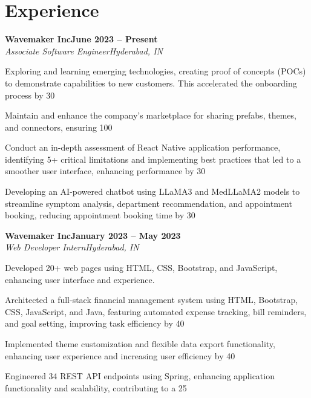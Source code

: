 \documentclass[letterpaper,10pt]{article}
\newcommand{\heading}[2]{
  \hspace{10pt}#1\hfill#2\\
}
\newcommand{\headingBf}[2]{
  \heading{\textbf{#1}}{\textbf{#2}}
}
\newcommand{\headingIt}[2]{
  \heading{\textit{#1}}{\textit{#2}}
}
\newenvironment{resume_list}{
  \vspace{-7pt}
  \begin{itemize}[itemsep=-2px, parsep=1pt, leftmargin=30pt]
}{
  \end{itemize}
}
\begin{document}
  \section{Experience}
  \headingBf{Wavemaker Inc}{June 2023 – Present}
  \headingIt{Associate Software Engineer}{Hyderabad, IN}
  \begin{resume_list}
    \item Exploring and learning emerging technologies, creating proof of concepts (POCs) to demonstrate capabilities to new customers. This accelerated the onboarding process by 30
    \item Maintain and enhance the company’s marketplace for sharing prefabs, themes, and connectors, ensuring 100
    \item Conduct an in-depth assessment of React Native application performance, identifying 5+ critical limitations and implementing best practices that led to a smoother user interface, enhancing performance by 30
    \item Developing an AI-powered chatbot using LLaMA3 and MedLLaMA2 models to streamline symptom analysis, department recommendation, and appointment booking, reducing appointment booking time by 30
  \end{resume_list}
  \headingBf{Wavemaker Inc}{January 2023 – May 2023}
  \headingIt{Web Developer Intern}{Hyderabad, IN}
  \begin{resume_list}
    \item Developed 20+ web pages using HTML, CSS, Bootstrap, and JavaScript, enhancing user interface and experience.
    \item Architected a full-stack financial management system using HTML, Bootstrap, CSS, JavaScript, and Java, featuring automated expense tracking, bill reminders, and goal setting, improving task efficiency by 40
    \item Implemented theme customization and flexible data export functionality, enhancing user experience and increasing user efficiency by 40
    \item Engineered 34 REST API endpoints using Spring, enhancing application functionality and scalability, contributing to a 25
  \end{resume_list}
\end{document}
